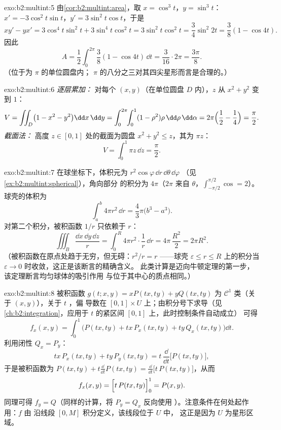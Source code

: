 \begin{solution}{exo:b2:multint:5}
由\cref{cor:b2:multint:area}，取 $x = \cos^3 t$，$y = \sin^3 t$：
$x' = -3\cos^2 t\sin t$，$y' = 3\sin^2 t\cos t$，于是
\[
xy' - yx' = 3\cos^4 t\sin^2 t + 3\sin^4 t\cos^2 t
= 3\sin^2 t\cos^2 t = \frac{3}{4}\sin^2 2t
= \frac{3}{8}(1 - \cos 4t) .
\]
因此
\[
A = \frac12\int_0^{2\pi}\frac38(1 - \cos 4t)\,\dd t
= \frac{3}{16}\cdot 2\pi = \frac{3\pi}{8} .
\]
（位于为 $\pi$ 的单位圆盘内；
$\pi$ 的八分之三对其四尖星形而言是合理的。）
\end{solution}

\begin{solution}{exo:b2:multint:6}
\emph{逐层累加：} 对每个 $(x, y)$（在单位圆盘 $D$ 内），$z$
从 $x^2 + y^2$ 变到 $1$：
\[
V = \iint_D \bigl(1 - x^2 - y^2\bigr)\dd x\,\dd y
= \int_0^{2\pi}\!\!\int_0^1 (1 - \rho^2)\rho\,\dd\rho\,\dd\alpha
= 2\pi\Bigl(\frac12 - \frac14\Bigr) = \frac\pi2 .
\]
\emph{截面法：} 高度 $z \in [0, 1]$ 处的截面为圆盘
$x^2 + y^2 \leq z$，其为 $\pi z$：
\[
V = \int_0^1 \pi z\,\dd z = \frac\pi2 .
\]
\end{solution}

\begin{solution}{exo:b2:multint:7}
在球坐标下，体积元为
$r^2\cos\varphi\,\dd r\,\dd\theta\,\dd\varphi$
（见\cref{ex:b2:multint:spherical}），角向部分
的积分为 $4\pi$（$2\pi$ 来自 $\theta$，$\int_{-\pi/2}^{\pi/2}\cos = 2$）。
球壳的体积为
\[
\int_a^b 4\pi r^2\,\dd r = \frac43\pi\bigl(b^3 - a^3\bigr).
\]
对第二个积分，被积函数 $1/r$ 只依赖于 $r$：
\[
\iiint_B \frac{\dd x\,\dd y\,\dd z}{r}
= \int_0^R 4\pi r^2\cdot\frac1r\,\dd r
= 4\pi\,\frac{R^2}{2} = 2\pi R^2 .
\]
（被积函数在原点处趋于无穷，但无碍：$r^2/r = r$
——球壳 $\varepsilon \leq r
\leq R$ 上的积分当 $\varepsilon \to 0$ 时收敛，这正是该断言的精确含义。
此类计算是迈向牛顿定理的第一步，
该定理断言均匀球体的吸引作用
与位于其中心的质点相同。）
\end{solution}

\begin{solution}{exo:b2:multint:8}
被积函数 $g(t; x, y) = xP(tx, ty) + yQ(tx, ty)$ 为
$\mathcal{C}^1$ 类（关于 $(x, y)$），关于 $t$ ，偏
导数在 $[0,1] \times U$ 上；由积分号下求导（见
\cref{ch:b2:integration}，应用于
$t$ 的紧区间 $[0,1]$ 上，此时控制条件自动成立）
可得
\[
f_x(x, y)
= \int_0^1 \bigl(P(tx, ty) + tx\,P_x(tx, ty)
+ ty\,Q_x(tx, ty)\bigr)\dd t .
\]
利用闭性 $Q_x = P_y$：
\[
tx\,P_x(tx, ty) + ty\,P_y(tx, ty)
= t\,\frac{\dd}{\dd t}\bigl[P(tx, ty)\bigr] ,
\]
于是被积函数为 $P(tx, ty) + t\frac{\dd}{\dd t}P(tx, ty) =
\frac{\dd}{\dd t}\bigl[t\,P(tx, ty)\bigr]$，从而
\[
f_x(x, y) = \Bigl[t\,P(tx, ty)\Bigr]_0^1 = P(x, y) .
\]
同理可得 $f_y = Q$（同样的计算，将 $P_y = Q_x$ 反向使用
）。注意条件在何处起作用：$f$ 由
沿线段 $[0, M]$ 积分定义，该线段位于 $U$ 中，
这正是因为 $U$ 为星形区域。
\end{solution}

